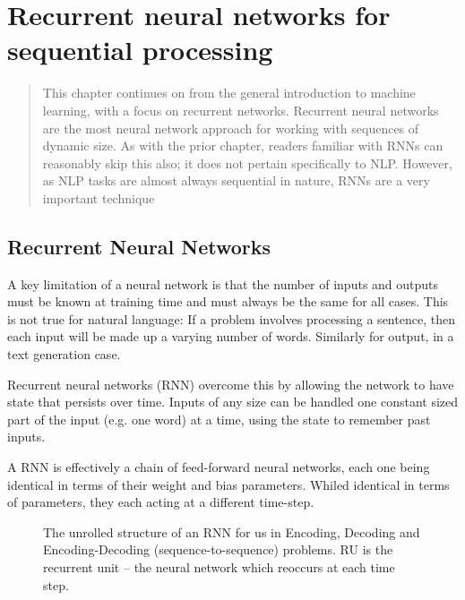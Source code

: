 \documentclass[12pt,parskip]{komatufte}
\begin{document}
	
\chapter{Recurrent neural networks for sequential processing}\label{sec:rnn}
\begin{abstract}
	This chapter continues on from the general introduction to machine learning, with a focus on recurrent networks.
	Recurrent neural networks are the most neural network approach for  working with sequences of dynamic size.
	As with the prior chapter, readers familiar with RNNs can reasonably skip this also;
	it does not pertain specifically to NLP.
	However, as NLP tasks are almost always sequential in nature, RNNs are a very important technique
\end{abstract}

\section{Recurrent Neural Networks}
A key limitation of a neural network is that the number of inputs and outputs must be known at training time and must always be the same for all cases.
This is not true for natural language: If a problem involves processing a sentence, then each input will be made up a varying number of words. Similarly for output, in a text generation case.

Recurrent neural networks (RNN) overcome this by allowing the network to have state that persists over time.
Inputs of any size can be handled one constant sized part of the input (e.g. one word) at a time, using the state to remember past inputs.


A RNN is effectively a chain of feed-forward neural networks,
each one being identical in terms of their weight and bias parameters.
Whiled identical in terms of parameters, they each acting at a different time-step.


\begin{figure}
	\caption{The unrolled structure of an RNN for us in Encoding, Decoding and Encoding-Decoding (sequence-to-sequence) problems. RU is the recurrent unit -- the neural network which reoccurs at each time step.}
	
	\label{fig-rnns}
	
	\resizebox{\textwidth}{!}{}
\end{figure}
\end{document}
